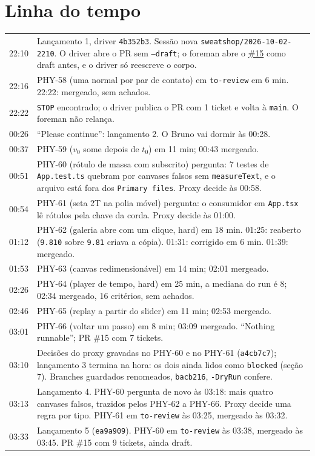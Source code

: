 \documentclass[11pt,a4paper]{article}
\begin{document}
\section{Linha do tempo}

\begin{tabularx}{\linewidth}{@{}lX@{}}
\toprule
22:10 & Lançamento 1, driver \texttt{4b352b3}. Sessão nova
        \texttt{sweatshop/2026-10-02-2210}. O driver abre o PR sem
        \texttt{--draft}; o foreman abre o
        \href{https://github.com/Laginho/PhysiSyst/pull/15}{\#15} como draft
        antes, e o driver só reescreve o corpo.\\
22:16 & PHY-58 (uma normal por par de contato) em \texttt{to-review} em 6 min.
        22:22: mergeado, sem achados.\\
22:22 & \texttt{STOP} encontrado; o driver publica o PR com 1 ticket e volta à
        \texttt{main}. O foreman não relança.\\
00:26 & ``Please continue'': lançamento 2. O Bruno vai dormir às 00:28.\\
00:37 & PHY-59 ($v_0$ some depois de $t_0$) em 11 min; 00:43 mergeado.\\
00:51 & PHY-60 (rótulo de massa com subscrito) pergunta: 7 testes de
        \texttt{App.test.ts} quebram por canvases falsos sem
        \texttt{measureText}, e o arquivo está fora dos \texttt{Primary files}.
        Proxy decide às 00:58.\\
00:54 & PHY-61 (seta 2T na polia móvel) pergunta: o consumidor em
        \texttt{App.tsx} lê rótulos pela chave da corda. Proxy decide às 01:00.\\
01:12 & PHY-62 (galeria abre com um clique, hard) em 18 min. 01:25:
        reaberto (\texttt{9.810} sobre \texttt{9.81} criava a cópia). 01:31:
        corrigido em 6 min. 01:39: mergeado.\\
01:53 & PHY-63 (canvas redimensionável) em 14 min; 02:01 mergeado.\\
02:26 & PHY-64 (player de tempo, hard) em 25 min, a mediana do run é 8;
        02:34 mergeado, 16 critérios, sem achados.\\
02:46 & PHY-65 (replay a partir do slider) em 11 min; 02:53 mergeado.\\
03:01 & PHY-66 (voltar um passo) em 8 min; 03:09 mergeado. ``Nothing
        runnable''; PR \#15 com 7 tickets.\\
03:10 & Decisões do proxy gravadas no PHY-60 e no PHY-61 (\texttt{a4cb7c7});
        lançamento 3 termina na hora: os dois ainda lidos como
        \texttt{blocked} (seção 7). Branches guardados renomeados,
        \texttt{bacb216}, \texttt{-DryRun} confere.\\
03:13 & Lançamento 4. PHY-60 pergunta de novo às 03:18: mais quatro canvases
        falsos, trazidos pelos PHY-62 a PHY-66. Proxy decide uma regra por tipo.
        PHY-61 em \texttt{to-review} às 03:25, mergeado às 03:32.\\
03:33 & Lançamento 5 (\texttt{ea9a909}). PHY-60 em \texttt{to-review} às 03:38,
        mergeado às 03:45. PR \#15 com 9 tickets, ainda draft.\\
\bottomrule
\end{tabularx}
\end{document}
